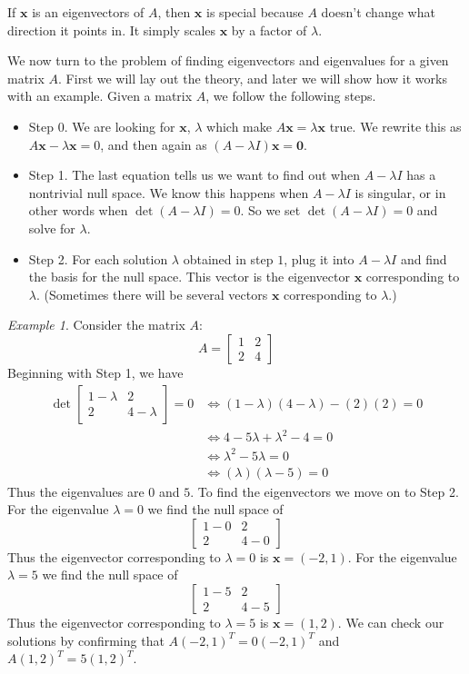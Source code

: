 \documentclass[11pt,oneside]{amsbook}
\theoremstyle{definition}
\theoremstyle{plain}
\theoremstyle{definition}
\theoremstyle{remark}
\newtheorem{example}[theorem]{Example}
\numberwithin{equation}{section}
\numberwithin{figure}{section}
\begin{document}
If $\mathbf{x}$ is an eigenvectors of $A$, then $\mathbf{x}$ is special because $A$ doesn't change what direction it points in. It simply scales $\mathbf{x}$ by a factor of $\lambda$.

We now turn to the problem of finding eigenvectors and eigenvalues for a given matrix $A$. First we will lay out the theory, and later we will show how it works with an example. Given a matrix $A$, we follow the following steps.

\begin{itemize}
  \item Step 0. We are looking for $\mathbf{x}$, $\lambda$ which make $A\mathbf{x}=\lambda\mathbf{x}$ true. We rewrite this as $A\mathbf{x}-\lambda\mathbf{x}=0$, and then again as $(A-\lambda I)\mathbf{x}=\mathbf{0}$.
  \item Step 1. The last equation tells us we want to find out when $A-\lambda I$ has a nontrivial null space. We know this happens when $A-\lambda I$ is singular, or in other words when $\det(A-\lambda I)=0$. So we set $\det(A-\lambda I)=0$ and solve for $\lambda$.
  \item Step 2. For each solution $\lambda$ obtained in step $1$, plug it into $A-\lambda I$ and find the basis for the null space. This vector is the eigenvector $\mathbf{x}$ corresponding to $\lambda$. (Sometimes there will be several vectors $\mathbf{x}$ corresponding to $\lambda$.)
\end{itemize}

\begin{example}
  Consider the matrix $A$:
  \[A=\begin{bmatrix}1&2\\2&4\end{bmatrix}
  \]
  Beginning with Step 1, we have
  \begin{align*}
    \det\begin{bmatrix}1-\lambda&2\\2&4-\lambda\end{bmatrix}=0
    &\iff (1-\lambda)(4-\lambda)-(2)(2)=0\\
    &\iff 4-5\lambda+\lambda^2-4=0\\
    &\iff \lambda^2-5\lambda=0\\
    &\iff (\lambda)(\lambda-5)=0
  \end{align*}
  Thus the eigenvalues are $0$ and $5$. To find the eigenvectors we move on to Step 2. For the eigenvalue $\lambda=0$ we find the null space of
  \[\begin{bmatrix}1-0&2\\2&4-0\end{bmatrix}
  \]
  Thus the eigenvector corresponding to $\lambda=0$ is $\mathbf{x}=(-2,1)$. For the eigenvalue $\lambda=5$ we find the null space of 
  \[\begin{bmatrix}1-5&2\\2&4-5\end{bmatrix}
  \]
  Thus the eigenvector corresponding to $\lambda=5$ is $\mathbf{x}=(1,2)$. We can check our solutions by confirming that $A(-2,1)^T=0(-2,1)^T$ and $A(1,2)^T=5(1,2)^T$.
\end{example}
  
\end{document}
